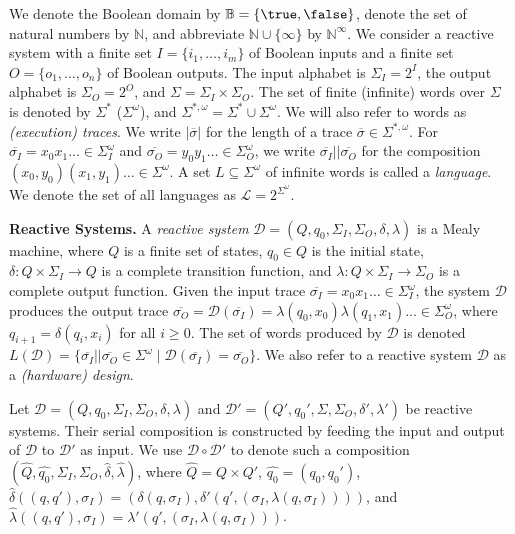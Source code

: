 \documentclass{llncs}
\newcommand{\B}{\mathbb{B}}
\newcommand{\N}{\mathbb{N}}
\newcommand{\design}{\mathcal{D}}
\newcommand{\states}{Q}
\newcommand{\init}{q_0}
\newcommand{\din}{I}
\newcommand{\dinalph}{\Sigma_I}
\newcommand{\dinletter}{{\sigma_I}}
\newcommand{\dintrace}{{\overline{\sigma_I}}}
\newcommand{\dout}{O}
\newcommand{\doutalph}{\Sigma_O}
\newcommand{\douttrace}{{\overline{\sigma_O}}}
\newcommand{\dalph}{\Sigma}
\newcommand{\dletter}{\sigma}
\newcommand{\dtrace}{\overline{\dletter}}
\newcommand{\lang}{L}
\newcommand{\langset}{\mathcal{L}}
\newcommand{\comp}{\circ}
\begin{document}
We denote the Boolean domain by $\B=\{\true,\false\}$, denote the set of 
natural numbers by $\N$, and abbreviate $\N\cup\{\infty\}$ by 
$\N^\infty$.
We consider a reactive system with a finite set 
$\din=\{i_1,\ldots,i_m\}$ of Boolean inputs and a finite set 
$\dout=\{o_1,\ldots,o_n\}$ of Boolean outputs.  The input alphabet is 
$\dinalph=2^\din$, the output alphabet is $\doutalph=2^O$, and 
$\dalph=\dinalph \times \doutalph$. The set of finite (infinite) words 
over $\dalph$ is denoted by $\dalph^*$ ($\dalph^\omega$), and 
$\dalph^{*,\omega} = \dalph^* \cup \dalph^\omega$.  We will also refer 
to words as \emph{(execution) traces}.  We write $|\dtrace|$ for the 
length of a trace $\dtrace\in \dalph^{*,\omega}$. For $\dintrace = x_0 
x_1 \ldots \in \dinalph^\omega$ and $\douttrace = y_0 y_1 \ldots \in 
\doutalph^\omega$, we write $\dintrace || \douttrace$ for the 
composition $(x_0,y_0) (x_1,y_1) \ldots \in \dalph^\omega$. A set $\lang 
\subseteq  \dalph^\omega$ of infinite words is called a \emph{language}. 
We denote the set of all languages as $\langset = 2^{\dalph^\omega}$.

\noindent
\textbf{Reactive Systems.}
A \emph{reactive system} $\design = (\states, \init, \dinalph, 
\doutalph, \delta, \lambda)$ is a Mealy machine, where $\states$ is a 
finite set of states, $\init\in \states$ is the initial state, $\delta: 
\states \times \dinalph \rightarrow \states$ is a complete transition 
function, and $\lambda: \states \times \dinalph \rightarrow \doutalph$ 
is a complete output function.  Given the input trace $\dintrace = x_0 
x_1 \ldots \in \dinalph^\omega$, the system $\design$ produces the 
output trace $\douttrace = \design(\dintrace) = \lambda(q_0, x_0) 
\lambda(q_1, x_1) \ldots \in \doutalph^\omega$, where $q_{i+1} = 
\delta(q_i, x_i)$ for all $i \ge 0$.  The set of words produced by 
$\design$ is denoted $\lang(\design) = \{\dintrace || \douttrace \in 
\dalph^\omega \mid \design(\dintrace) = \douttrace\}$.  We also refer to 
a reactive system $\design$ as a \emph{(hardware) design}.

Let $\design = (\states, \init, \dinalph, \doutalph, \delta, \lambda)$ 
and $\design' = (\states', \init', \dalph, \doutalph, \delta', 
\lambda')$ be reactive systems.  Their serial composition is constructed 
by feeding the input and output of $\design$ to $\design'$ as input.  We 
use $\design \comp \design'$ to denote such a composition 
$(\hat{\states}, \hat{\init}, \dinalph, \doutalph, \hat{\delta}, 
\hat{\lambda})$, where
$\hat{\states} = \states \times \states'$, 
$\hat{\init} = (\init, \init')$,
$\hat{\delta}((q,q'),\dinletter) = (\delta(q,\dinletter),
                   \delta'(q',(\dinletter,\lambda(q,\dinletter))))$, and
$\hat{\lambda}((q,q'),\dinletter) =
                     \lambda'(q',(\dinletter,\lambda(q,\dinletter)))$.   
\end{document}
